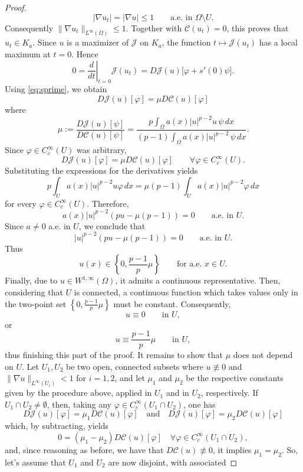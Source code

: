 \documentclass[10pt,a4paper]{amsart}
\begin{document}
\begin{proof}
$$
|\nabla u_t|=|\nabla u|\leq1
\qquad\text{a.e. in }\Omega\setminus U.
$$
Consequently $\|\nabla u_t\|_{L^\infty(\Omega)}\leq1$. Together with $\mathcal C(u_t)=0$, this proves that $u_t\in K_a$. Since $u$ is a maximizer of $\mathcal J$ on $K_a$, the function $t\longmapsto\mathcal J(u_t)$ has a local maximum at $t=0$. Hence
$$
0
=
\left.\frac{d}{dt}\right|_{t=0}
\mathcal J(u_t)
=
D\mathcal J(u)
\bigl[
\varphi+s'(0)\psi
\bigr].
$$
Using \eqref{eq:sprime}, we obtain
$$
D\mathcal J(u)[\varphi]
=
\mu
D\mathcal C(u)[\varphi] 
$$
where
\begin{equation} \label{eq:defmu}
\mu:=
\frac{
D\mathcal J(u)[\psi]
}{
D\mathcal C(u)[\psi]
} = \frac{p\int_\Omega a(x) |u|^{p-2}u \, \psi \,dx}{(p-1) \int_\Omega a(x) |u|^{p-2} \, \psi \, dx}.
\end{equation}
Since $\varphi\in C_c^\infty(U)$ was arbitrary,
$$
D\mathcal J(u)[\varphi]
=
\mu D\mathcal C(u)[\varphi]
\qquad
\forall\varphi\in C_c^\infty(U).
$$
Substituting the expressions for the derivatives yields
$$
p\int_U
a(x)|u|^{p-2}u\varphi\,dx
=
\mu(p-1)
\int_U
a(x)|u|^{p-2}\varphi\,dx
$$
for every $\varphi\in C_c^\infty(U)$. Therefore,
$$
a(x)|u|^{p-2}
\left(
pu-\mu(p-1)
\right)
=0
\qquad\text{a.e. in }U.
$$
Since $a\neq0$ a.e. in $U$, we conclude that
$$
|u|^{p-2}
\left(
pu-\mu(p-1)
\right)
=0
\qquad\text{a.e. in }U.
$$
Thus
$$
u(x)
\in
\left\{
0,\frac{p-1}{p}\mu
\right\}
\qquad\text{for a.e. }x\in U.
$$
Finally, due to $u\in W^{1,\infty}(\Omega)$, it admits a continuous representative. Then, considering that $U$ is connected, a continuous function which takes values only in the two-point set $\left\{
0,\frac{p-1}{p}\mu
\right\}
$ must be constant. Consequently,
$$
u\equiv0
\qquad\text{in }U,
$$
or
$$
u\equiv\frac{p-1}{p}\mu
\qquad\text{in }U,
$$
thus finishing this part of the proof. It remains to show that $\mu$ does not depend on $U$. Let $U_1, U_2$ be two open, connected subsets where  $u \not \equiv 0$ and $\|\nabla u\|_{L^\infty (U_i)} < 1$ for $i = 1, 2$, and let $\mu_1$ and $\mu_2$ be the respective constants given by the procedure above, applied in $U_1 $ and in $U_2$, respectively. If $U_1 \cap U_2 \not = \emptyset $, then, taking any $\varphi \in C_c^{\infty}(U_1 \cap U_2)$, one has
$$D \mathcal J (u) [\varphi] = \mu_1 D \mathcal{C}(u)[\varphi] \quad \text{and} \quad  D \mathcal J (u) [\varphi] = \mu_2 D \mathcal{C}(u)[\varphi]$$
which, by subtracting, yields
$$0 = (\mu_1 - \mu_2) D \mathcal{C}(u)[\varphi] \quad \forall \varphi \in C_c^{\infty}(U_1 \cap U_2),$$
and, since reasoning as before, we have that $D\mathcal C(u) \not \equiv 0$, it implies $\mu_1 = \mu_2$. So, let's assume that $U_1$ and $U_2$ are now disjoint, with associated

\end{proof}
\end{document}
